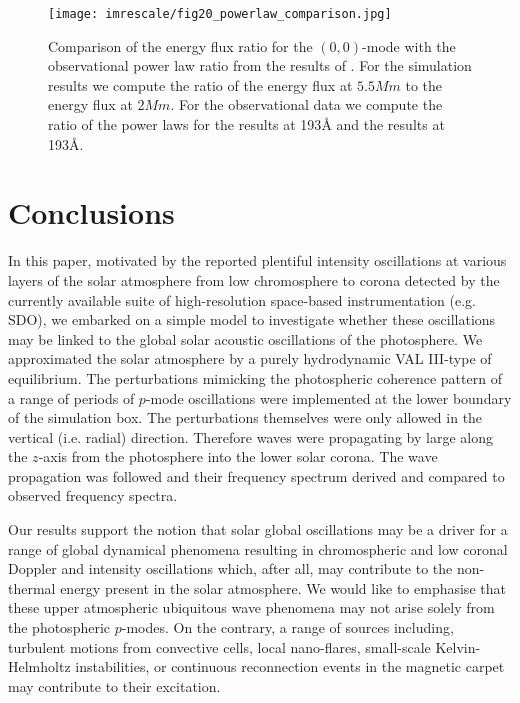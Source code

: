 \documentclass[preprint,authoryear,12pt]{elsarticle}
\begin{document}
\begin{figure}[t]
\texttt{[image: imrescale/fig20\_powerlaw\_comparison.jpg]}
\caption{Comparison of the energy flux ratio for the $(0,0)$-mode with the observational power law ratio from the results of  \citet{Ireland2015}. For the simulation results we compute the ratio of the energy flux at $5.5Mm$ to the energy flux at $2Mm$. For the observational data we compute the ratio of the power laws for the results at 193{\AA} and the results at 193{\AA}.}
\label{Fig20}
\end{figure}




\section{Conclusions}

In this paper, motivated by the reported plentiful intensity oscillations at various layers of the solar atmosphere from low chromosphere to corona detected by the currently available suite of high-resolution space-based instrumentation (e.g. SDO), we embarked on a simple model to investigate whether these oscillations may be linked to the global solar acoustic oscillations of the photosphere. We approximated the solar atmosphere by a purely hydrodynamic VAL III-type of equilibrium. The perturbations mimicking the photospheric coherence pattern of a range of periods of $p$-mode oscillations were implemented at the lower boundary of the simulation box. The perturbations themselves were only allowed in the vertical (i.e. radial) direction. Therefore waves were propagating by large along the $z$-axis from the photosphere into the lower solar corona. The wave propagation was followed and their frequency spectrum derived and compared to observed frequency spectra.

Our results support the notion that solar global oscillations may be a driver for a range of global dynamical phenomena 
resulting in chromospheric and low coronal Doppler and intensity oscillations which, after all, may contribute to the non-thermal energy present in the solar atmosphere. We would like to emphasise that these upper atmospheric ubiquitous wave phenomena may not arise solely from the photospheric $p$-modes. On the contrary, a range of sources including, turbulent motions from convective cells, local nano-flares, small-scale Kelvin-Helmholtz instabilities, or continuous reconnection events in the magnetic carpet may contribute to their excitation. 
\end{document}
